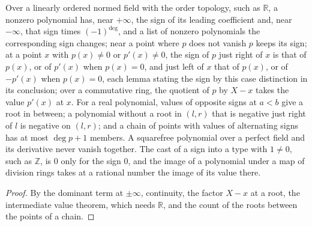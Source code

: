 \begin{lemma}\label{lem:polySigns}
  \leanok
  Over a linearly ordered normed field with the order topology, such as $\mathbb{R}$, a nonzero
  polynomial has, near $+\infty$, the sign of its leading coefficient and, near $-\infty$, that sign
  times $(-1)^{\deg}$, and a list of nonzero polynomials the corresponding sign changes; near a
  point where $p$ does not vanish $p$ keeps its sign; at a point $x$ with $p(x) \ne 0$ or
  $p'(x) \ne 0$, the sign of $p$ just right of $x$ is that of $p(x)$, or of $p'(x)$ when $p(x) = 0$,
  and just left of $x$ that of $p(x)$, or of $-p'(x)$ when $p(x) = 0$, each lemma stating the sign
  by this case distinction in its conclusion; over a commutative ring, the quotient of $p$ by
  $X - x$ takes the value $p'(x)$ at $x$. For a real polynomial, values of opposite signs at $a < b$
  give a root in between; a polynomial without a root in $(l, r)$ that is negative just right of $l$
  is negative on $(l, r)$; and a chain of points with values of alternating signs has at most
  $\deg p + 1$ members. A squarefree polynomial over a perfect field and its derivative never vanish
  together. The cast of a sign into a type with $1 \ne 0$, such as $\mathbb{Z}$, is $0$ only for the
  sign $0$, and the image of a polynomial under a map of division rings takes at a rational number
  the image of its value there.
\end{lemma}

\begin{proof}\leanok
  By the dominant term at $\pm\infty$, continuity, the factor $X - x$ at a root, the intermediate
  value theorem, which needs $\mathbb{R}$, and the count of the roots between the points of a chain.
\end{proof}

